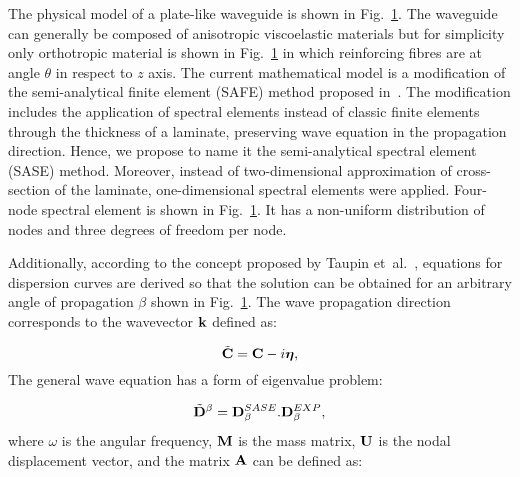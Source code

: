 	The physical model of a plate-like waveguide is shown in 
	Fig.~\ref{fig:layered_composite_SASE}.  The waveguide can generally be composed 
	of anisotropic viscoelastic materials but for simplicity only orthotropic material is 
	shown in Fig.~\ref{fig:layered_composite_SASE} in which reinforcing fibres are at 
	angle \(\theta\) in respect to \(z\) axis. The current mathematical model is a 
	modification of the semi-analytical finite element (SAFE) method proposed 
	in~\cite{Bartoli2006}. The modification includes the application of spectral elements 
	instead of classic finite elements through the thickness of a laminate, preserving 
	wave equation in the propagation direction. Hence, we propose to name it the 
	semi-analytical spectral element (SASE) method. Moreover, instead of 
	two-dimensional approximation of cross-section of the laminate, one-dimensional 
	spectral elements were applied. Four-node spectral element is shown in 
	Fig.~\ref{fig:layered_composite_SASE}. It has a non-uniform distribution of nodes 
	and three degrees of freedom per node.
	
		
\begin{figure} [h!]
		\centering
{}
				
\caption{}

		\label{fig:layered_composite_SASE}
	\end{figure}

	Additionally, according to the concept proposed by Taupin et~al.~\cite{Taupin2011}, 
	equations for dispersion curves are derived so that the solution can be obtained for 
	an arbitrary angle of propagation \(\beta\) shown in 
	Fig.~\ref{fig:layered_composite_SASE}. The wave propagation direction corresponds 
	to the wavevector \(\mathbf{k}\) defined as:
	
	
\begin{equation}
 \tilde{\mathbf{C}}= \mathbf{C} - i \boldsymbol{\eta},
\label{eq:complex_elasticity_tensor}
\end{equation}
	 The general wave 
	equation has a form of eigenvalue problem:


\begin{equation}
		\tilde{\mathbf{D}}^{\beta} =  \mathbf{D}^{SASE}_{\beta}  .    \mathbf{D}^{EXP}_{\beta} ,
	\label{eq:objective_fun}
	\end{equation}
	where \(\omega\) is the angular frequency, \(\mathbf{M}\) is the mass matrix, 
	\(\mathbf{U}\) is the nodal displacement vector, and the matrix \(\mathbf{A}\) can be 
	defined as:
	
